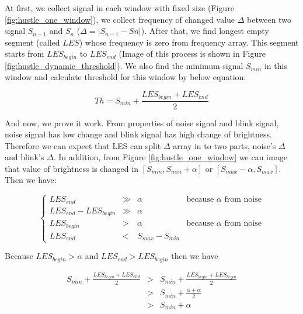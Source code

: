 At first, we collect signal in each window with fixed size (Figure \ref{fig:hustle_one_window}), we collect frequency of changed value $\Delta$ between two signal $S_{n-1}$ and $S_{n}$ ($\Delta = |S_{n-1} - S{n}| $). After that, we find longest empty segment (called $LES$) whose frequency is zero from frequency array. This segment starts from $LES_{begin}$ to $LES_{end}$ (Image of this process is shown in Figure \ref{fig:hustle_dynamic_threshold}). We also find the minimum signal $S_{min}$ in this window and calculate threshold for this window by below equation:

\begin{equation}
{Th}=S_{min} + \frac{LES_{begin}+LES_{end}}{2}
\end{equation}

And now, we prove it work. From properties of noise signal and blink signal, noise signal has low change and blink signal has high change of brightness. Therefore we can expect that LES can split $\Delta$ array in to two parts, noise's $\Delta$ and blink's $\Delta$. In addition, from Figure \ref{fig:hustle_one_window} we can image that value of brightness is changed in $[S_{min}, S_{min} + \alpha]$ or $[S_{max} - \alpha, S_{max}]$. Then we have:

\begin{equation}
\left\{ 
\begin{array}{lclr}
    LES_{end} & \gg &  \alpha  & \text{because $\alpha$ from noise} \\
    LES_{end} - LES_{begin}  & \gg & \alpha \\
    LES_{begin} & > & \alpha & \text{because $\alpha$ from noise} \\%
    LES_{end}  & <  & S_{max} - S_{min} &
\end{array} \right.
\end{equation}

Because $LES_{begin} > \alpha$ and $LES_{end} > LES_{begin}$ then we have%

\begin{equation}
\begin{array}{lcl}

   S_{min} + \frac{LES_{begin}+LES_{end}}{2} & > & S_{min} + \frac{LES_{begin}+LES_{begin}}{2} \\
    & > &  S_{min} + \frac{\alpha+\alpha}{2} \\
     & >  & S_{min} + \alpha
\end{array} 
\end{equation}

